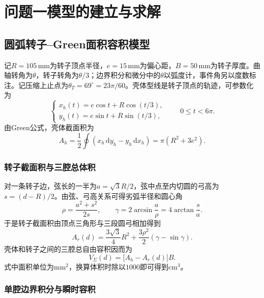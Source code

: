 \documentclass[withoutpreface,bwprint]{cumcmthesis}
\begin{document}
\section{问题一模型的建立与求解}
\subsection{圆弧转子--Green面积容积模型}

记$R=105\,\mathrm{mm}$为转子顶点半径，$e=15\,\mathrm{mm}$为偏心距，$B=50\,\mathrm{mm}$为转子厚度。曲轴转角为$\theta$，转子转角为$\theta/3$；边界积分和微分中的$\theta$以弧度计，事件角另以度数标注。记压缩上止点为$\theta_T=69^\circ=23\pi/60$。壳体型线是转子顶点的轨迹，可参数化为
\begin{equation}
 \begin{cases}
 x_h(t)=e\cos t+R\cos(t/3),\\
 y_h(t)=e\sin t+R\sin(t/3),
 \end{cases}\qquad 0\leq t<6\pi .
 \label{eq:q1-housing-curve}
\end{equation}
由Green公式，壳体截面积为
\begin{equation}
 A_h=\frac{1}{2}\oint\left(x_h\,\mathrm{d}y_h-y_h\,\mathrm{d}x_h\right)
     =\pi\left(R^2+3e^2\right).
 \label{eq:q1-housing-area}
\end{equation}

\subsubsection{转子截面积与三腔总体积}

对一条转子边，弦长的一半为$a=\sqrt{3}R/2$，弦中点至内切圆的弓高为$s=(d-R)/2$。由弦、弓高关系可得劣弧半径和圆心角
\begin{equation}
 \rho=\frac{a^2+s^2}{2s},\qquad
 \gamma=2\arcsin\frac{a}{\rho}=4\arctan\frac{s}{a}.
 \label{eq:q1-arc-geometry}
\end{equation}
于是转子截面积由顶点三角形与三段圆弓相加得到
\begin{equation}
 A_r(d)=\frac{3\sqrt{3}}{4}R^2+\frac{3\rho^2}{2}\left(\gamma-\sin\gamma\right).
 \label{eq:q1-rotor-area}
\end{equation}
壳体和转子之间的三腔总自由容积因而为
\begin{equation}
 V_{\Sigma}(d)=\bigl[A_h-A_r(d)\bigr]B.
 \label{eq:q1-total-volume}
\end{equation}
式中面积单位为$\mathrm{mm^2}$，换算体积时除以$1000$即可得到$\mathrm{cm^3}$。

\subsubsection{单腔边界积分与瞬时容积}
\end{document}
